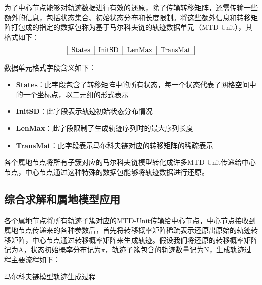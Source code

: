 
为了中心节点能够对轨迹数据进行有效的还原，除了传输转移矩阵，还需传输一些额外的信息，包括状态集合、初始状态分布和长度限制。将这些额外信息和转移矩阵打包成的指定的数据包称为基于马尔科夫链的轨迹数据单元（MTD-Unit），其格式如下：
$$
\begin{tabular}{|c|c|c|c|}
\hline States&InitSD&LenMax&TransMat\\
\hline
\end{tabular}
$$

数据单元格式字段含义如下：
\begin{itemize}
\item \textbf{States}：此字段包含了转移矩阵中的所有状态，每一个状态代表了网格空间中的一个坐标点，以二元组的形式表示
\item \textbf{InitSD}：此字段表示轨迹初始状态分布情况
\item \textbf{LenMax}：此字段限制了生成轨迹序列时的最大序列长度
\item \textbf{TransMat}：此字段表示马尔科夫链对应的转移矩阵的稀疏表示
\end{itemize}

各个属地节点将所有子簇对应的马尔科夫链模型转化成许多MTD-Unit传递给中心节点，中心节点通过这种特殊的数据包能够将轨迹数据进行还原。

\subsection{综合求解和属地模型应用}

各个属地节点将所有轨迹子簇对应的MTD-Unit传输给中心节点，中心节点接收到属地节点传递来的各种参数后，首先将转移概率矩阵稀疏表示还原出原始的轨迹转移矩阵，中心节点通过转移概率矩阵来生成轨迹。假设我们将还原的转移概率矩阵记为A，状态初始概率分布记为$\pi$，轨迹子簇包含的轨迹数量记为N，生成轨迹过程主要流程如下：\\
\begin{algorithm}[H]
	\label{markovGen}
	 \caption{马尔科夫链模型轨迹生成过程}
\end{algorithm}

